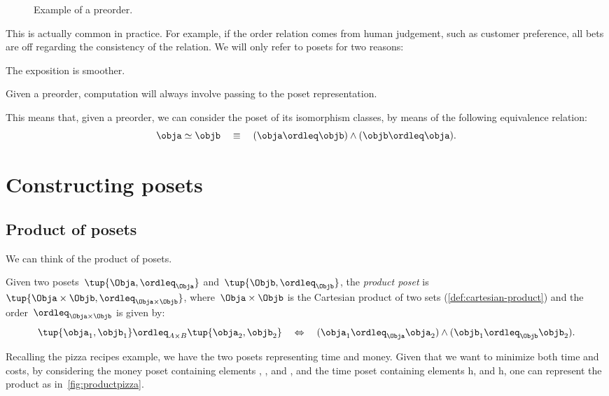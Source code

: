 \begin{figure}[tbh]
  \begin{center}
  \end{center}
  \caption{Example of a preorder. \label{fig:preorder}}
\end{figure}

This is actually common in practice. For example, if the order relation comes from human judgement, such as customer preference, all bets are off regarding the consistency of the relation. We will only refer to posets for two reasons:
\begin{compactenum}
  \item The exposition is smoother.
  \item Given a preorder, computation will always involve passing to the poset representation.
\end{compactenum}
This means that, given a preorder, we can consider the poset of its isomorphism classes, by means of the following equivalence relation:
\begin{equation}
  \obja \simeq \objb \quad \equiv \quad (\obja \ordleq \objb) \wedge (\objb \ordleq \obja).
\end{equation}

\section{Constructing posets}

\subsection{Product of posets}
We can think of the product of posets.

\begin{definition}
  \label{def:productposet}
  Given two posets~$\tup{\Obja, \ordleq_{\Obja}}$
  and~$\tup{\Objb, \ordleq_{\Objb}}$, the \emph{product poset} is~$\tup{\Obja \times \Objb, \ordleq_{\Obja\times \Objb}}$, where~$\Obja \times \Objb$ is the Cartesian product of two sets (\cref{def:cartesian-product}) and the order~$\ordleq_{\Obja \times \Objb}$ is given by:
  \begin{equation}
    \tup{\obja_1, \objb_1}
    \ordleq_{A\times B}
    \tup{\obja_2, \objb_2}
    \quad
    \Leftrightarrow
    \quad
    (\obja_1 \ordleq_\Obja \obja_2) \wedge
    (\objb_1 \ordleq_\Objb \objb_2).
  \end{equation}
\end{definition}
Recalling the pizza recipes example, we have the two posets representing time and money. Given that we want to minimize both time and costs, by considering the money poset containing elements \unit[1]{\USD}, \unit[2]{\USD}, and \unit[3]{\USD}, and the time poset containing elements \unit[1]{h}, and \unit[2]{h}, one can represent the product as in~\cref{fig:productpizza}.

